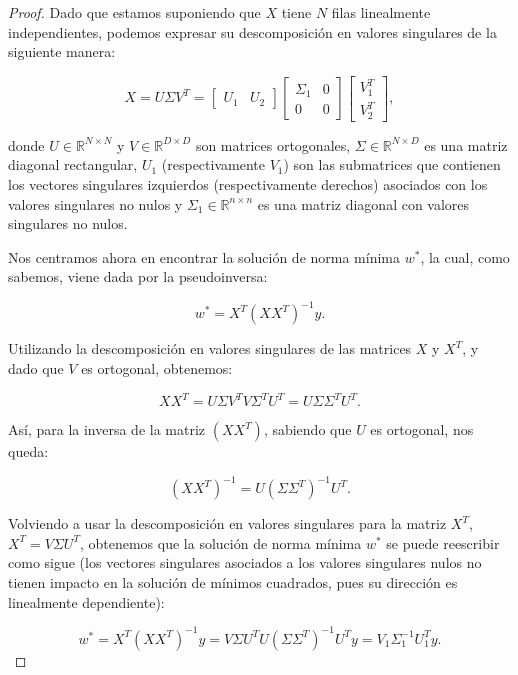 \begin{proof}
    Dado que estamos suponiendo que $X$ tiene $N$ filas linealmente independientes, podemos expresar su descomposición en valores singulares de la siguiente manera:

    \[
        X = U \Sigma V^T = \begin{bmatrix} U_1 & U_2 \end{bmatrix} \begin{bmatrix} \Sigma_1 & 0 \\ 0 & 0 \end{bmatrix} \begin{bmatrix} V_1^T \\ V_2^T \end{bmatrix},
    \]

    donde $U \in \mathbb{R}^{N \times N}$ y $V \in \mathbb{R}^{D \times D}$ son matrices ortogonales, $\Sigma \in \mathbb{R}^{N \times D}$ es una matriz diagonal rectangular, $U_1$ (respectivamente $V_1$) son las submatrices que contienen los vectores singulares izquierdos (respectivamente derechos) asociados con los valores singulares no nulos y $\Sigma_1 \in \mathbb{R}^{n \times n}$ es una matriz diagonal con valores singulares no nulos.

    Nos centramos ahora en encontrar la solución de norma mínima $w^{*}$, la cual, como sabemos, viene dada por la pseudoinversa:

    \[
        w^* = X^T {(X X^T)}^{-1} y.
    \]

    Utilizando la descomposición en valores singulares de las matrices $X$ y $X^{T}$, y dado que $V$ es ortogonal, obtenemos:

    \[
        X X^T = U \Sigma V^{T} V \Sigma^{T} U^{T} = U \Sigma \Sigma^{T} U^{T}.
    \]

    Así, para la inversa de la matriz ${(X X^T)}$, sabiendo que $U$ es ortogonal, nos queda:

    \[
        {(X X^T)}^{-1} = U {(\Sigma \Sigma^{T})}^{-1} U^{T}.
    \]

    Volviendo a usar la descomposición en valores singulares para la matriz $X^{T}$, $X^{T} = V \Sigma U^{T}$, obtenemos que la solución de norma mínima $w^{*}$ se puede reescribir como sigue (los vectores singulares asociados a los valores singulares nulos no tienen impacto en la solución de mínimos cuadrados, pues su dirección es linealmente dependiente):

    \[
        w^* = X^T {(X X^T)}^{-1} y = V \Sigma U^{T} U {(\Sigma \Sigma^{T})}^{-1} U^{T}y = V_1 \Sigma_1^{-1} U_{1}^T y.
    \]


\end{proof}
